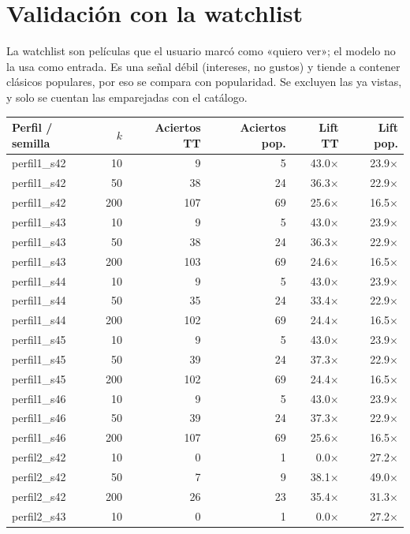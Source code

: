 \section{Validación con la watchlist}
La watchlist son películas que el usuario marcó como «quiero ver»; el modelo no la usa como entrada. Es una señal débil (intereses, no gustos) y tiende a contener clásicos populares, por eso se compara con popularidad. Se excluyen las ya vistas, y solo se cuentan las emparejadas con el catálogo.
\begin{table}[H]\centering\small
\begin{tabular}{lrrrrr}\toprule
Perfil / semilla & $k$ & Aciertos TT & Aciertos pop. & Lift TT & Lift pop. \\\midrule
perfil1\_s42 & 10 & 9 & 5 & 43.0$\times$ & 23.9$\times$ \\
perfil1\_s42 & 50 & 38 & 24 & 36.3$\times$ & 22.9$\times$ \\
perfil1\_s42 & 200 & 107 & 69 & 25.6$\times$ & 16.5$\times$ \\
perfil1\_s43 & 10 & 9 & 5 & 43.0$\times$ & 23.9$\times$ \\
perfil1\_s43 & 50 & 38 & 24 & 36.3$\times$ & 22.9$\times$ \\
perfil1\_s43 & 200 & 103 & 69 & 24.6$\times$ & 16.5$\times$ \\
perfil1\_s44 & 10 & 9 & 5 & 43.0$\times$ & 23.9$\times$ \\
perfil1\_s44 & 50 & 35 & 24 & 33.4$\times$ & 22.9$\times$ \\
perfil1\_s44 & 200 & 102 & 69 & 24.4$\times$ & 16.5$\times$ \\
perfil1\_s45 & 10 & 9 & 5 & 43.0$\times$ & 23.9$\times$ \\
perfil1\_s45 & 50 & 39 & 24 & 37.3$\times$ & 22.9$\times$ \\
perfil1\_s45 & 200 & 102 & 69 & 24.4$\times$ & 16.5$\times$ \\
perfil1\_s46 & 10 & 9 & 5 & 43.0$\times$ & 23.9$\times$ \\
perfil1\_s46 & 50 & 39 & 24 & 37.3$\times$ & 22.9$\times$ \\
perfil1\_s46 & 200 & 107 & 69 & 25.6$\times$ & 16.5$\times$ \\
perfil2\_s42 & 10 & 0 & 1 & 0.0$\times$ & 27.2$\times$ \\
perfil2\_s42 & 50 & 7 & 9 & 38.1$\times$ & 49.0$\times$ \\
perfil2\_s42 & 200 & 26 & 23 & 35.4$\times$ & 31.3$\times$ \\
perfil2\_s43 & 10 & 0 & 1 & 0.0$\times$ & 27.2$\times$ \\

\end{tabular}
\end{table}
